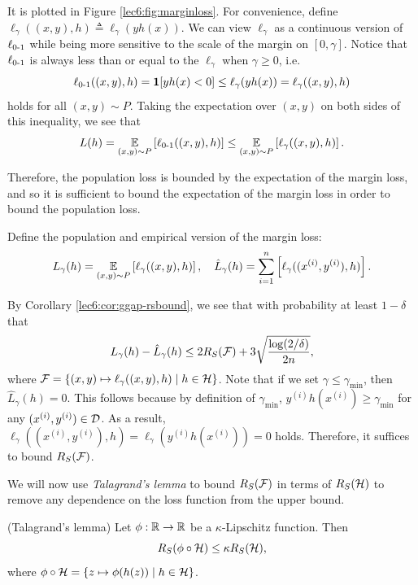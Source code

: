 It is plotted in Figure \ref{lec6:fig:marginloss}. For convenience, define $\ell_\gamma((x,y), h) \triangleq \ell_\gamma(yh(x))$. We can view $\ell_\gamma$ as a continuous version of $\ell_{\textup{0-1}}$ while being more sensitive to the scale of the margin on $[0,\gamma]$. Notice that $\ell_{\textup{0-1}}$ is always less than or equal to the $\ell_\gamma$ when $\gamma\geq 0$, i.e.
\begin{equation}
    \ell_{\textup{0-1}}((x,y), h) = \mathbf{1}[yh(x) < 0]\leq \ell_\gamma(yh(x)) =\ell_\gamma ((x,y), h)
\end{equation}
holds for all $(x,y)\sim P$. Taking the expectation over $(x,y)$ on both sides of this inequality, we see that
\begin{equation}
    L(h) = \operatorname*{\mathbb{E}}_{(x,y)\sim P} \left[ \ell_{\textup{0-1}}((x,y), h) \right] \leq \operatorname*{\mathbb{E}}_{(x,y)\sim P} \left[ \ell_\gamma ((x,y), h) \right].
\end{equation}

Therefore, the population loss is bounded by the expectation of the margin loss, and so it is sufficient to bound the expectation of the margin loss in order to bound the population loss.

Define the population and empirical version of the margin loss:
\begin{equation}
L_\gamma(h) = \operatorname*{\mathbb{E}}_{(x,y)\sim P}\left[ \ell_\gamma((x,y), h)\right], \quad \hat{L}_\gamma(h) = \sum_{i=1}^n\left [\ell_\gamma((x^{(i)},y^{(i)}), h)\right].
\end{equation}

By Corollary \ref{lec6:cor:ggap-rsbound}, we see that with probability at least $1-\delta$ that
\begin{equation}
L_\gamma(h) - \hat{L}_\gamma(h)\leq 2R_S(\mathcal F) + 3\sqrt{\frac{\log (2/\delta)}{2n}},
\end{equation}
where $\mathcal F = \{(x,y)\mapsto \ell_\gamma((x,y), h)\mid h\in\mathcal H\}$. Note that if we set $\gamma\leq \gamma_{\min}$, then $\hat{L}_{\gamma}(h) = 0$. This follows because by definition of $\gamma_{\min}$, $y^{(i)}h(x^{(i)})\geq \gamma_{\min}$ for any $(x^{(i)}, y^{(i)})\in \mathcal D$. As a result, $\ell_\gamma((x^{(i)}, y^{(i)}), h) = \ell_\gamma(y^{(i)}h(x^{(i)})) = 0$ holds. Therefore, it suffices to bound $R_S(\mathcal F)$.

We will now use \textit{Talagrand's lemma} to bound $R_S(\mathcal F)$ in terms of $R_S(\mathcal H)$ to remove any dependence on the loss function from the upper bound. 
 
\begin{lemma}{(Talagrand's lemma)}
Let $\phi:\mathbb R\to\mathbb R$ be a $\kappa$-Lipschitz function. Then \begin{equation}
    R_S(\phi\circ \mathcal H)\leq \kappa R_S(\mathcal H),
\end{equation} 
where $\phi\circ\mathcal H = \{z\mapsto \phi(h(z))\mid h\in\mathcal H\}$.
\end{lemma}

